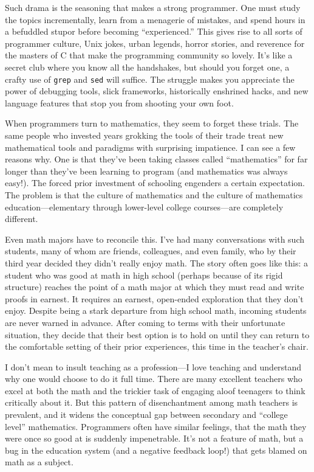 Such drama is the seasoning that makes a strong programmer. One must study the
topics incrementally, learn from a menagerie of mistakes, and spend hours in a
befuddled stupor before becoming ``experienced.'' This gives rise to all sorts
of programmer culture, Unix jokes, urban legends, horror stories, and reverence
for the masters of C that make the programming community so lovely. It's like a
secret club where you know all the handshakes, but should you forget one, a
crafty use of \texttt{grep} and \texttt{sed} will suffice. The struggle makes
you appreciate the power of debugging tools, slick frameworks, historically
enshrined hacks, and new language features that stop you from shooting your own
foot.

When programmers turn to mathematics, they seem to forget these trials. The
same people who invested years grokking the tools of their trade treat new
mathematical tools and paradigms with surprising impatience. I can see a few
reasons why. One is that they've been taking classes called ``mathematics'' for
far longer than they've been learning to program (and mathematics was always
easy!). The forced prior investment of schooling engenders a certain
expectation. The problem is that the culture of mathematics and the culture of
mathematics education---elementary through lower-level college courses---are
completely different.

Even math majors have to reconcile this. I've had many conversations with such
students, many of whom are friends, colleagues, and even family, who by their
third year decided they didn't really enjoy math. The story often goes like
this: a student who was good at math in high school (perhaps because of its
rigid structure) reaches the point of a math major at which they must read and
write proofs in earnest. It requires an earnest, open-ended exploration that
they don't enjoy. Despite being a stark departure from high school math,
incoming students are never warned in advance. After coming to terms with their
unfortunate situation, they decide that their best option is to hold on until
they can return to the comfortable setting of their prior experiences, this
time in the teacher's chair.

I don't mean to insult teaching as a profession---I love teaching and
understand why one would choose to do it full time. There are many excellent
teachers who excel at both the math and the trickier task of engaging aloof
teenagers to think critically about it. But this pattern of disenchantment
among math teachers is prevalent, and it widens the conceptual gap between
secondary and ``college level'' mathematics. Programmers often have similar
feelings, that the math they were once so good at is suddenly impenetrable.
It's not a feature of math, but a bug in the education system (and a negative
feedback loop!) that gets blamed on math as a subject.


